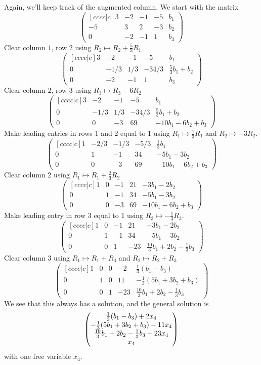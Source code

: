 \documentclass{article}
\begin{document}
\begin{Example}
Again, we'll keep track of the augmented column. We start with the
matrix \[\begin{pmatrix}[cccc|c] 3 & -2 & -1 & -5 & b_1 \\ -5 & 3 &
2 & -3 & b_2 \\ 0 & -2 & -1 & 1 & b_3\end{pmatrix}\] Clear column
\(1\), row \(2\) using \(R_2\mapsto
R_2+\frac{5}{3}R_1\)\[\begin{pmatrix}[cccc|c] 3 & -2 & -1 & -5 &
b_1\\ 0 & -1/3 & 1/3 & -34/3 & \frac{5}{3}b_1+b_2 \\ 0 & -2 & -1 & 1
& b_3 \end{pmatrix}\] Clear column \(2\), row \(3\) using
\(R_3\mapsto R_3-6R_2\)\[\begin{pmatrix}[cccc|c] 3 & -2 & -1 & -5 &
b_1 \\ 0 & -1/3 & 1/3 & -34/3 & \frac{5}{3}b_1+b_2 \\ 0 & 0 & -3 &
69 & -10b_1-6b_2+b_3 \end{pmatrix}\] Make leading entries in rows 1
and 2 equal to 1 using \(R_1\mapsto \frac{1}{3}R_1\) and
\(R_2\mapsto -3R_2\). \[\begin{pmatrix}[cccc|c] 1 & -2/3 & -1/3 &
-5/3 & \frac{1}{3}b_1 \\ 0 & 1 & -1 & 34 & -5b_1-3b_2 \\ 0 & 0 & -3
& 69 & -10b_1-6b_2+b_3 \end{pmatrix}\] Clear column 2 using
\(R_1\mapsto R_1+\frac{2}{3}R_2\)\[\begin{pmatrix}[cccc|c] 1 & 0 &
-1 & 21 &-3b_1-2b_2 \\ 0 & 1 & -1 & 34 & -5b_1-3b_2 \\ 0 & 0 & -3 &
69 & -10b_1-6b_2+b_3 \end{pmatrix}\] Make leading entry in row 3
equal to 1 using \(R_3\mapsto -\frac{1}{3}R_3\).
\[\begin{pmatrix}[cccc|c] 1 & 0 & -1 & 21 & -3b_1-2b_2\\ 0 & 1 & -1
& 34 & -5b_1-3b_2 \\ 0 & 0 & 1 & -23 &
\frac{10}{3}b_1+2b_2-\frac{1}{3}b_3 \end{pmatrix}\] Clear column 3
using \(R_1\mapsto R_1+R_3\) and \(R_2\mapsto R_2+R_3\)
\[\begin{pmatrix}[cccc|c] 1 & 0 & 0 & -2 & \frac{1}{3}(b_1-b_3) \\ 0
& 1 & 0 & 11 & -\frac{1}{3}(5b_1+3b_2+b_3) \\ 0 & 0 & 1 & -23 &
\frac{10}{3}b_1+2b_2-\frac{1}{3}b_3 \end{pmatrix}\] We see that this
always has a solution, and the general solution is \[\begin{pmatrix}
\frac{1}{3}(b_1-b_3)+2x_4\\ -\frac{1}{3}(5b_1+3b_2+b_3)-11x_4\\ \frac{10}{3}b_1+2b_2-\frac{1}{3}b_3+23x_4\\ x_4\end{pmatrix}\]
with one free variable \(x_4\).


\end{Example}
\end{document}
